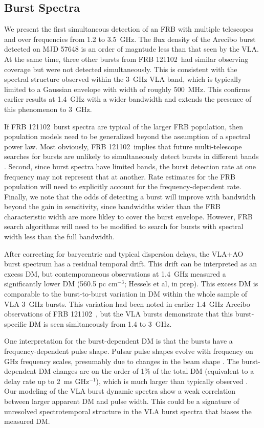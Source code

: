 \documentclass[twocolumn]{aastex61}
\newcommand{\frb}{FRB 121102}
\begin{document}
\subsection{Burst Spectra}

We present the first simultaneous detection of an FRB with multiple telescopes and over frequencies from 1.2 to 3.5~GHz. The flux density of the Arecibo burst detected on MJD 57648 is an order of magntude less than that seen by the VLA. At the same time, three other bursts from \frb\ had similar observing coverage but were not detected simultaneously. This is consistent with the spectral structure observed within the 3~GHz VLA band, which is typically limited to a Gaussian envelope with width of roughly 500~MHz. This confirms earlier results at 1.4~GHz \citep{2016Natur.531..202S,2016arXiv160308880S} with a wider bandwidth and extends the presence of this phenomenon to 3~GHz.

If \frb\ burst spectra are typical of the larger FRB population, then population models need to be generalized beyond the assumption of a spectral power law. Most obviously, \frb\ implies that future multi-telescope searches for bursts are unlikely to simultaneously detect bursts in different bands \citep[c.f.][]{1999ApJ...517..460S}. Second, since burst spectra have limited bands, the burst detection rate at one frequency may not represent that at another. Rate estimates for the FRB population will need to explicitly account for the frequency-dependent rate. Finally, we note that the odds of detecting a burst will improve with bandwidth beyond the gain in sensitivity, since bandwidths wider than the FRB characteristic width are more likley to cover the burst envelope. However, FRB search algorithms will need to be modified to search for bursts with spectral width less than the full bandwidth.

After correcting for barycentric and typical dispersion delays, the VLA+AO burst spectrum has a residual temporal drift. This drift can be interpreted as an excess DM, but contemporaneous observations at 1.4~GHz measured a significantly lower DM (560.5 pc cm$^{-3}$; Hessels et al, in prep). This excess DM is comparable to the burst-to-burst variation in DM within the whole sample of VLA 3~GHz bursts. This variation had been noted in earlier 1.4~GHz Arecibo observations of \frb\ \citep{2016arXiv160308880S}, but the VLA bursts demonstrate that this burst-specific DM is seen simltaneously from 1.4 to 3~GHz.

One interpretation for the burst-dependent DM is that the bursts have a frequency-dependent pulse shape. Pulsar pulse shapes evolve with frequency on GHz frequency scales, presumably due to changes in the beam shape \citep{1988MNRAS.234..477L}. The burst-dependent DM changes are on the order of 1\% of the total DM (equivalent to a delay rate up to 2~ms GHz$^{-1}$), which is much larger than typically observed \citep{2017MNRAS.466.3706L}. Our modeling of the VLA burst dynamic spectra show a weak correlation between larger apparent DM and pulse width. This could be a signature of unresolved spectrotemporal structure in the VLA burst spectra that biases the measured DM.
\end{document}
